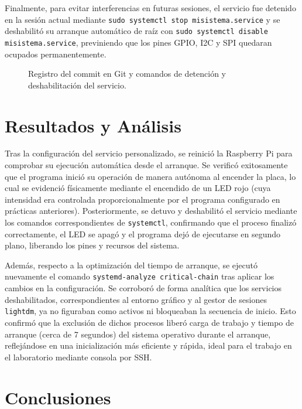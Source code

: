 \documentclass[conference]{IEEEtran}
\begin{document}
Finalmente, para evitar interferencias en futuras sesiones, el servicio fue detenido en la sesión actual mediante \texttt{sudo systemctl stop misistema.service} y se deshabilitó su arranque automático de raíz con \texttt{sudo systemctl disable misistema.service}, previniendo que los pines GPIO, I2C y SPI quedaran ocupados permanentemente.

\begin{figure}[H]
    \centering
  
    \caption{Registro del commit en Git y comandos de detención y deshabilitación del servicio.}
    \label{fig:c10}
\end{figure}
\section{Resultados y Análisis}


Tras la configuración del servicio personalizado, se reinició la Raspberry Pi para comprobar su ejecución automática desde el arranque. Se verificó exitosamente que el programa inició su operación de manera autónoma al encender la placa, lo cual se evidenció físicamente mediante el encendido de un LED rojo (cuya intensidad era controlada proporcionalmente por el programa configurado en prácticas anteriores). Posteriormente, se detuvo y deshabilitó el servicio mediante los comandos correspondientes de \texttt{systemctl}, confirmando que el proceso finalizó correctamente, el LED se apagó y el programa dejó de ejecutarse en segundo plano, liberando los pines y recursos del sistema.

Además, respecto a la optimización del tiempo de arranque, se ejecutó nuevamente el comando \texttt{systemd-analyze critical-chain} tras aplicar los cambios en la configuración. Se corroboró de forma analítica que los servicios deshabilitados, correspondientes al entorno gráfico y al gestor de sesiones \texttt{lightdm}, ya no figuraban como activos ni bloqueaban la secuencia de inicio. Esto confirmó que la exclusión de dichos procesos liberó carga de trabajo y tiempo de arranque (cerca de 7 segundos) del sistema operativo durante el arranque, reflejándose en una inicialización más eficiente y rápida, ideal para el trabajo en el laboratorio mediante consola por SSH.
\section{Conclusiones}
\end{document}
